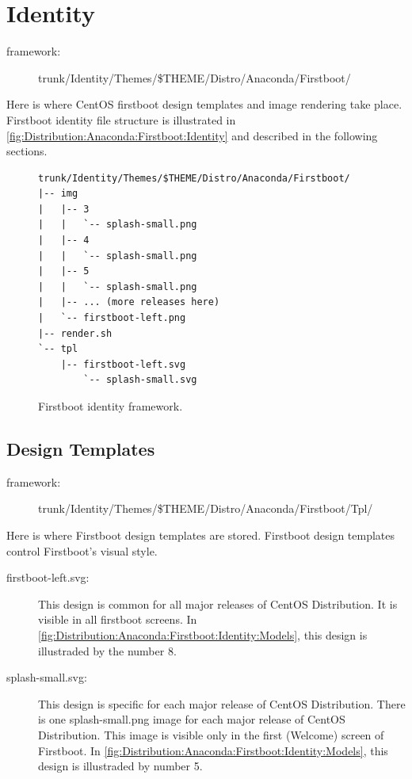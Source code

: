 \section{Identity}
\hypertarget{sec:Distribution:Anaconda:Firstboot:Identity}{}
\label{sec:Distribution:Anaconda:Firstboot:Identity}

\begin{description}
\item[framework:]
trunk/Identity/Themes/\$THEME/Distro/Anaconda/Firstboot/
\end{description}

\noindent Here is where CentOS firstboot design templates and image
rendering take place. Firstboot identity file structure is illustrated
in \autoref{fig:Distribution:Anaconda:Firstboot:Identity} and
described in the following sections.

\begin{figure}
\hrulefill
\begin{verbatim}
trunk/Identity/Themes/$THEME/Distro/Anaconda/Firstboot/
|-- img
|   |-- 3
|   |   `-- splash-small.png
|   |-- 4
|   |   `-- splash-small.png
|   |-- 5
|   |   `-- splash-small.png
|   |-- ... (more releases here)
|   `-- firstboot-left.png
|-- render.sh
`-- tpl
    |-- firstboot-left.svg
        `-- splash-small.svg
\end{verbatim}
\hrulefill
\caption{Firstboot identity framework.%
   \label{fig:Distribution:Anaconda:Firstboot:Identity}}
\end{figure}

\subsection{Design Templates}

\begin{description}
\item[framework:]
trunk/Identity/Themes/\$THEME/Distro/Anaconda/Firstboot/Tpl/
\end{description}

\noindent Here is where Firstboot design templates are stored.
Firstboot design templates control Firstboot's visual style. 

\begin{description}

\item[firstboot-left.svg:] This design is common for all major
releases of CentOS Distribution. It is visible in all firstboot
screens. In
\autoref{fig:Distribution:Anaconda:Firstboot:Identity:Models}, this
design is illustraded by the number 8.

\item[splash-small.svg:] This design is specific for each major
release of CentOS Distribution.  There is one splash-small.png image
for each major release of CentOS Distribution. This image is visible
only in the first (Welcome) screen of Firstboot. In
\autoref{fig:Distribution:Anaconda:Firstboot:Identity:Models}, this
design is illustraded by number 5.

\end{description}

